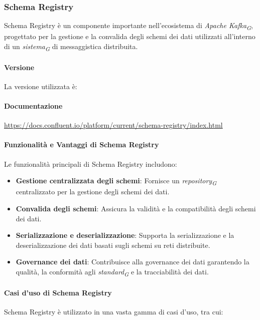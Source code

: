 \subsubsection{Schema Registry}
Schema Registry è un componente importante nell'ecosistema di \textit{Apache Kafka}\textsubscript{\textit{G}}, progettato per la gestione e la convalida degli schemi dei dati utilizzati all'interno di un \textit{sistema}\textsubscript{\textit{G}} di messaggistica distribuita.
\paragraph{Versione}
La versione utilizzata è: 
\paragraph{Documentazione}
\href{https://docs.confluent.io/platform/current/schema-registry/index.html}{https://docs.confluent.io/platform/current/schema-registry/index.html}

\paragraph{Funzionalità e Vantaggi di Schema Registry}
Le funzionalità principali di Schema Registry includono:
\begin{itemize}
    \item \textbf{Gestione centralizzata degli schemi}: Fornisce un \textit{repository}\textsubscript{\textit{G}} centralizzato per la gestione degli schemi dei dati.
    \item \textbf{Convalida degli schemi}: Assicura la validità e la compatibilità degli schemi dei dati.
    \item \textbf{Serializzazione e deserializzazione}: Supporta la serializzazione e la deserializzazione dei dati basati sugli schemi su reti distribuite.
    \item \textbf{Governance dei dati}: Contribuisce alla governance dei dati garantendo la qualità, la conformità agli \textit{standard}\textsubscript{\textit{G}} e la tracciabilità dei dati.
\end{itemize}

\paragraph{Casi d'uso di Schema Registry}

Schema Registry è utilizzato in una vasta gamma di casi d'uso, tra cui:

